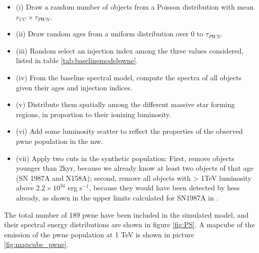 \documentclass[main.tex]{subfiles}
\begin{document}
\begin{itemize}
\item (i) Draw a random number of objects from a Poisson distribution with mean $r_{CC} \times \tau_{PWN}$.
\item (ii) Draw random ages from a uniform distribution over 0 to $\tau_{PWN}$.
\item(iii) Random select an injection index among the three values considered, listed in table \ref{tab:baselinemodelpwne}.
\item (iv) From the baseline spectral model, compute the spectra of all objects given their ages and injection indices.
\item (v) Distribute them spatially among the different massive star forming regions, in proportion to their ionizing luminosity.
\item(vi) Add some luminosity scatter to reflect the properties of the observed \gls{pwne} population in the \gls{mw}.
  \item(vii) Apply two cuts in the synthetic population: First, remove objects younger than 2kyr, because we already know at least two objects of that age (SN 1987A and N158A); second, remove all objects with > 1TeV luminosity above $2.2 \times 10^{34}$ erg s$^{-1}$, because they would have been detected by \gls{hess} already, as shown in the upper limits calculated for SN1987A in \cite{2012HESSLMC}. 
\end{itemize}

The total number of 189 \gls{pwne} have been included in the simulated model, and their spectral energy distributions are shown in figure \ref{fig:PS}. A mapcube of the emission of the \gls{pwne} population at 1 TeV is shown in picture \ref{fig:mapcube_pwne}.
\end{document}
